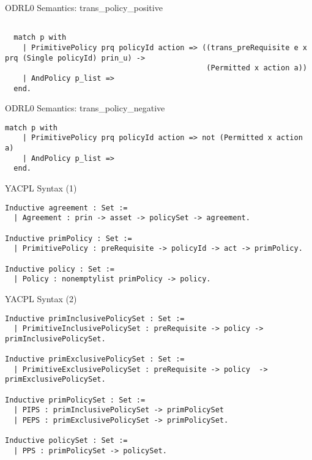 \documentclass{beamer}
\begin{document}
\begin{frame}[fragile]{ODRL0 Semantics: trans\_policy\_positive}
\lstset{language=Coq}
\begin{lstlisting}

  match p with
    | PrimitivePolicy prq policyId action => ((trans_preRequisite e x prq (Single policyId) prin_u) ->
                                              (Permitted x action a))
    | AndPolicy p_list => 
  end.
\end{lstlisting}
\end{frame}

\begin{frame}[fragile]{ODRL0 Semantics: trans\_policy\_negative}
\lstset{language=Coq}
\begin{lstlisting}
match p with
    | PrimitivePolicy prq policyId action => not (Permitted x action a)
    | AndPolicy p_list => 
  end.
\end{lstlisting}
\end{frame}
\begin{frame}[fragile]{YACPL Syntax (1)}
\lstset{language=Coq}
\begin{lstlisting}
Inductive agreement : Set :=
  | Agreement : prin -> asset -> policySet -> agreement.

Inductive primPolicy : Set :=
  | PrimitivePolicy : preRequisite -> policyId -> act -> primPolicy.

Inductive policy : Set :=
  | Policy : nonemptylist primPolicy -> policy.
\end{lstlisting}
\end{frame}
\begin{frame}[fragile]{YACPL Syntax (2)}
\lstset{language=Coq}
\begin{lstlisting}
Inductive primInclusivePolicySet : Set :=
  | PrimitiveInclusivePolicySet : preRequisite -> policy -> primInclusivePolicySet.

Inductive primExclusivePolicySet : Set :=
  | PrimitiveExclusivePolicySet : preRequisite -> policy  -> primExclusivePolicySet.

Inductive primPolicySet : Set :=
  | PIPS : primInclusivePolicySet -> primPolicySet
  | PEPS : primExclusivePolicySet -> primPolicySet.

Inductive policySet : Set :=
  | PPS : primPolicySet -> policySet.

\end{lstlisting}
\end{frame}
\end{document}
